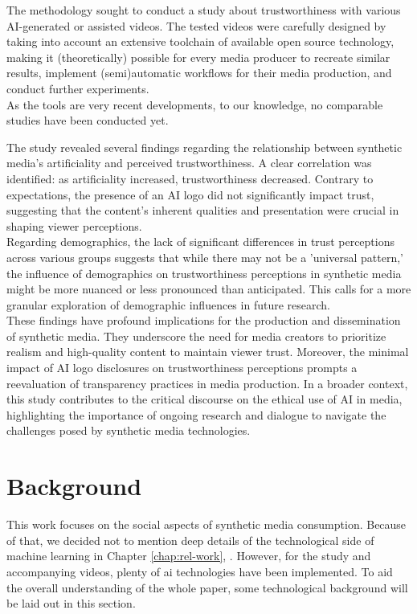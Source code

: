 \documentclass[
  a4paper,  %
  twoside,  %
  bibliography=totoc,
  headsepline,
  cleardoublepage=empty,
  parskip=half,
  draft=false
]{scrbook}
\begin{document}
The methodology sought to conduct a study about trustworthiness with various AI-generated or assisted videos.
The tested videos were carefully designed by taking into account an extensive toolchain of available open source technology, making it (theoretically) possible for every media producer to recreate similar results, implement (semi)automatic workflows for their media production, and conduct further experiments. \\
As the tools are very recent developments, to our knowledge, no comparable studies have been conducted yet.

The study revealed several findings regarding the relationship between synthetic media's artificiality and perceived trustworthiness. A clear correlation was identified: as artificiality increased, trustworthiness decreased. Contrary to expectations, the presence of an AI logo did not significantly impact trust, suggesting that the content's inherent qualities and presentation were crucial in shaping viewer perceptions. \\
Regarding demographics, the lack of significant differences in trust perceptions across various groups suggests that while there may not be a 'universal pattern,' the influence of demographics on trustworthiness perceptions in synthetic media might be more nuanced or less pronounced than anticipated. This calls for a more granular exploration of demographic influences in future research. \\
These findings have profound implications for the production and dissemination of synthetic media. They underscore the need for media creators to prioritize realism and high-quality content to maintain viewer trust. Moreover, the minimal impact of AI logo disclosures on trustworthiness perceptions prompts a reevaluation of transparency practices in media production. In a broader context, this study contributes to the critical discourse on the ethical use of AI in media, highlighting the importance of ongoing research and dialogue to navigate the challenges posed by synthetic media technologies.
\chapter{Background}
\label{chap:background}
This work focuses on the social aspects of synthetic media consumption. Because of that, we decided not to mention deep details of the technological side of machine learning in Chapter \ref{chap:rel-work}, . However, for the study and accompanying videos, plenty of \gls{ai} technologies have been implemented. To aid the overall understanding of the whole paper, some technological background will be laid out in this section.
\end{document}
